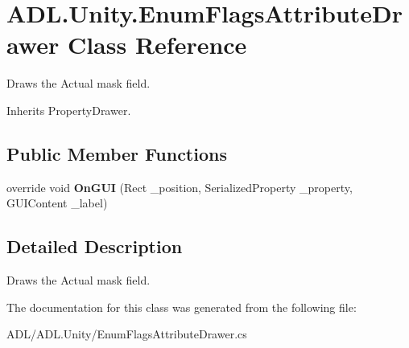 \hypertarget{class_a_d_l_1_1_unity_1_1_enum_flags_attribute_drawer}{}\section{A\+D\+L.\+Unity.\+Enum\+Flags\+Attribute\+Drawer Class Reference}
\label{class_a_d_l_1_1_unity_1_1_enum_flags_attribute_drawer}


Draws the Actual mask field.  




Inherits Property\+Drawer.

\subsection*{Public Member Functions}
\begin{DoxyCompactItemize}
\item 
\mbox{\label{class_a_d_l_1_1_unity_1_1_enum_flags_attribute_drawer_a4b117e80308b1e6e61eae375c4bd18f1}} 
override void {\bfseries On\+G\+UI} (Rect \+\_\+position, Serialized\+Property \+\_\+property, G\+U\+I\+Content \+\_\+label)
\end{DoxyCompactItemize}


\subsection{Detailed Description}
Draws the Actual mask field. 



The documentation for this class was generated from the following file\+:\begin{DoxyCompactItemize}
\item 
A\+D\+L/\+A\+D\+L.\+Unity/Enum\+Flags\+Attribute\+Drawer.\+cs\end{DoxyCompactItemize}
